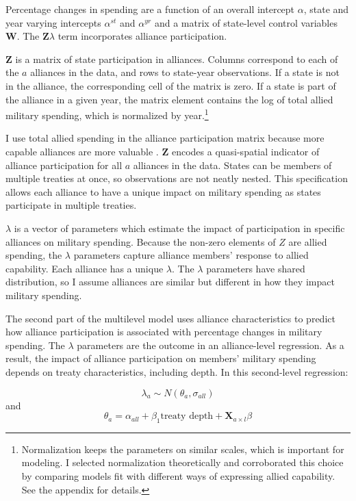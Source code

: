 \documentclass[12pt]{article}
\begin{document}
Percentage changes in spending are a function of an overall intercept $\alpha$, state and year varying intercepts $\alpha^{st}$ and $\alpha^{yr}$ and a matrix of state-level control variables $\textbf{W}$.
The $\textbf{Z} \lambda$ term incorporates alliance participation.


$\textbf{Z}$ is a matrix of state participation in alliances. 
Columns correspond to each of the $a$ alliances in the data, and rows to state-year observations. 
If a state is not in the alliance, the corresponding cell of the matrix is zero.
If a state is part of the alliance in a given year, the matrix element contains the log of total allied military spending, which is normalized by year.\footnote{Normalization keeps the parameters on similar scales, which is important for modeling. I selected normalization theoretically and corroborated this choice by comparing models fit with different ways of expressing allied capability. See the appendix for details.} 


I use total allied spending in the alliance participation matrix because more capable alliances are more valuable \citep{Johnsonetal2015}. 
$\textbf{Z}$ encodes a quasi-spatial indicator of alliance participation for all $a$ alliances in the data. 
States can be members of multiple treaties at once, so observations are not neatly nested. 
This specification allows each alliance to have a unique impact on military spending as states participate in multiple treaties. 


$\lambda$ is a vector of parameters which estimate the impact of participation in specific alliances on military spending. 
Because the non-zero elements of $Z$ are allied spending, the $\lambda$ parameters capture alliance members' response to allied capability. 
Each alliance has a unique $\lambda$. 
The $\lambda$ parameters have shared distribution, so I assume alliances are similar but different in how they impact military spending. 


The second part of the multilevel model uses alliance characteristics to predict how alliance participation is associated with percentage changes in military spending. 
The $\lambda$ parameters are the outcome in an alliance-level regression.
As a result, the impact of alliance participation on members' military spending depends on treaty characteristics, including depth. 
In this second-level regression: 


\begin{equation}
\lambda_{a} \sim N(\theta_{a}, \sigma_{all})
\end{equation} 
and 
\begin{equation}
\theta_{a} = \alpha_{all} + \beta_1 \mbox{treaty depth} + \textbf{X}_{a \times l} \beta
\end{equation}
\end{document}
